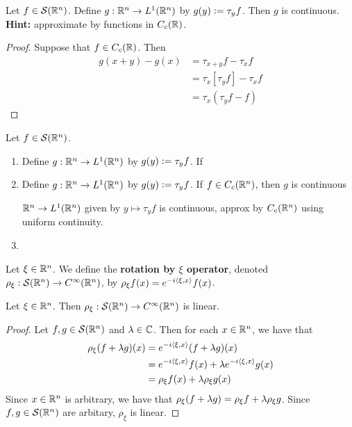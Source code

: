 \documentclass{book}
\begin{document}
	\begin{ex}
		Let $f \in \mathcal{S}(\mathbb{R}^n)$. Define $g: \mathbb{R}^n \rightarrow L^1(\mathbb{R}^n)$ by $g(y) \vcentcolon= \tau_y f$. Then $g$ is continuous. \\
		\textbf{Hint:} approximate by functions in $C_c(\mathbb{R})$. 
	\end{ex}
	
	\begin{proof}
		Suppose that $f \in C_c(\mathbb{R})$. Then 
		\begin{align*}
			g(x + y) - g(x)
			& = \tau_{x + y}f - \tau_xf \\
			& = \tau_x [\tau_y f]  - \tau_x f \\
			& = \tau_x (\tau_y f - f)
		\end{align*}
	\end{proof}


	\begin{ex}Let $f \in \mathcal{S}(\mathbb{R}^n)$.
		\begin{enumerate}
			\item  Define $g:\mathbb{R}^n \rightarrow L^1(\mathbb{R}^n)$ by $g(y) \vcentcolon= \tau_y f$. If 
			\item Define $g:\mathbb{R}^n \rightarrow L^1(\mathbb{R}^n)$ by $g(y) \vcentcolon= \tau_y f$. If $f \in C_c(\mathbb{R}^n)$, then $g$ is continuous
			
			 $\mathbb{R}^n \rightarrow L^1(\mathbb{R}^n)$ given by $y \mapsto \tau_y f$ is continuous, approx by $C_c(\mathbb{R}^n)$ using uniform continuity.
			\item 
		\end{enumerate}
	\end{ex}


	\begin{defn}
		Let $\xi \in \mathbb{R}^n$. We define the \textbf{rotation by $\xi$ operator}, denoted $\rho_{\xi}: \mathcal{S}(\mathbb{R}^n) \rightarrow C^{\infty}(\mathbb{R}^n)$, by $\rho_{\xi}f(x) = e^{-i \langle \xi, x \rangle }f(x)$.
	\end{defn}

	\begin{ex}
		Let $\xi \in \mathbb{R}^n$. Then $\rho_{\xi}: \mathcal{S}(\mathbb{R}^n) \rightarrow C^{\infty}(\mathbb{R}^n)$ is linear.
	\end{ex}

	\begin{proof}
		Let $f, g \in \mathcal{S}(\mathbb{R}^n)$ and $\lambda \in \mathbb{C}$. Then for each $x \in \mathbb{R}^n$, we have that
		\begin{align*}
			\rho_{\xi}(f + \lambda g)(x) 
			& = e^{-i \langle \xi, x\rangle}(f+ \lambda g)(x) \\
			& = e^{-i \langle \xi, x\rangle}f(x) + \lambda e^{-i \langle \xi, x\rangle} g(x) \\
			& = \rho_{\xi}f (x) + \lambda \rho_{\xi} g(x)
		\end{align*}
		Since $x \in \mathbb{R}^n$ is arbitrary, we have that $\rho_{\xi} (f + \lambda g) = \rho_{\xi} f + \lambda \rho_{\xi} g$. Since $f, g \in \mathcal{S}(\mathbb{R}^n)$ are arbitary, $\rho_{\xi}$ is linear. 
	\end{proof}
\end{document}
